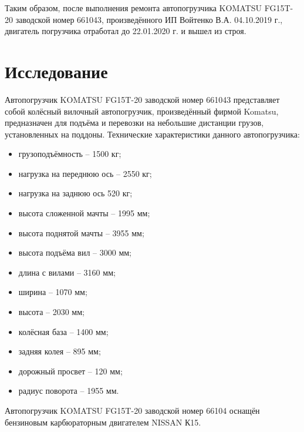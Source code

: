 Таким образом, после выполнения ремонта автопогрузчика KOMATSU FG15T-20 заводской номер 661043, произведённого ИП Войтенко В.А.  04.10.2019 г., двигатель погрузчика отработал до 22.01.2020 г. и вышел из строя.


\section{Исследование}


Автопогрузчик KOMATSU FG15T-20 заводской номер 661043  представляет собой колёсный вилочный автопогрузчик, произведённый фирмой Komatsu, предназначен для подъёма и перевозки на небольшие дистанции грузов, установленных на поддоны. Технические характеристики данного автопогрузчика:\\

\begin{itemize}
\item 	грузоподъёмность – 1500 кг;
\item 	нагрузка на переднюю ось – 2550 кг;
\item 	нагрузка на заднюю ось 520 кг;
\item 	высота сложенной мачты – 1995 мм;
\item  высота поднятой мачты – 3955 мм;
\item 	высота подъёма вил – 3000 мм;
\item 	длина с вилами – 3160 мм;
\item 	ширина – 1070 мм;
\item 	высота – 2030 мм;
\item 	колёсная база – 1400 мм;
\item 	задняя колея – 895 мм;
\item 	дорожный просвет – 120 мм;
\item 	радиус поворота – 1955 мм.
\end{itemize}

Автопогрузчик KOMATSU FG15T-20 заводской номер 66104 оснащён бензиновым карбюраторным двигателем NISSAN К15.

